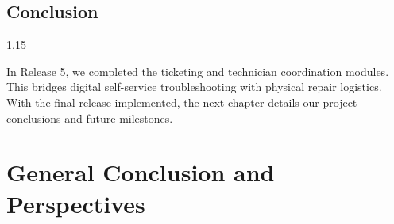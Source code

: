 \documentclass[12pt,a4paper]{report}
\begin{document}
\section{Conclusion}
\begin{spacing}{1.15}
\setlength{\parskip}{2pt}

In Release 5, we completed the ticketing and technician coordination modules. This bridges digital self-service troubleshooting with physical repair logistics. With the final release implemented, the next chapter details our project conclusions and future milestones.

\end{spacing}

\chapter*{General Conclusion and Perspectives}
\end{document}
